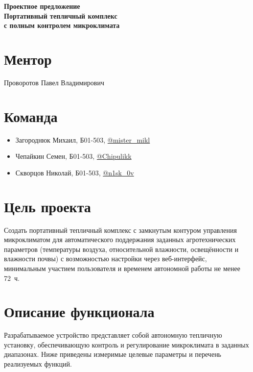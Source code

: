 \documentclass[a4paper,12pt]{article}
\begin{document}
\begin{center}
    {\Large \textbf{Проектное предложение}} \\[0.5cm]
    {\Huge \textbf{Портативный тепличный комплекс}} \\
    {\Large \textbf{с полным контролем микроклимата}}
\end{center}

\section*{Ментор}
Проворотов Павел Владимирович

\section*{Команда}
\begin{itemize}
    \item Загороднюк Михаил, Б01-503, \href{https://t.me/mister_mikl}{@mister\_mikl}
    \item Чепайкин Семен, Б01-503, \href{https://t.me/Chipulikk}{@Chipulikk}
    \item Скворцов Николай, Б01-503, \href{https://t.me/n1sk_0v}{@n1sk\_0v}
\end{itemize}

\section*{Цель проекта}
Создать портативный тепличный комплекс с замкнутым контуром управления микроклиматом для автоматического поддержания заданных агротехнических параметров (температуры воздуха, относительной влажности, освещённости и влажности почвы) с возможностью настройки через веб-интерфейс, минимальным участием пользователя и временем автономной работы не менее 72~ч.

\section*{Описание функционала}
Разрабатываемое устройство представляет собой автономную тепличную установку, обеспечивающую контроль и регулирование микроклимата в заданных диапазонах. Ниже приведены измеримые целевые параметры и перечень реализуемых функций.
\end{document}
